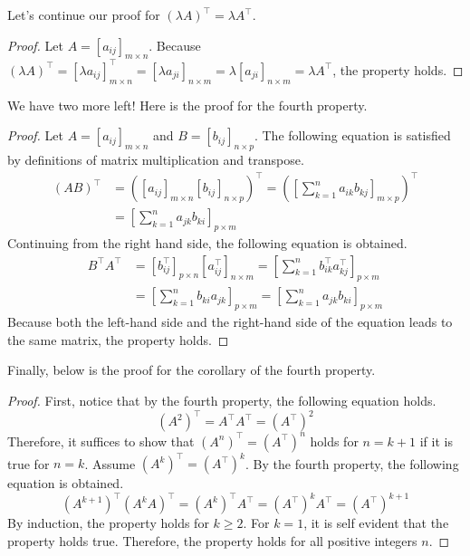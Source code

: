 \documentclass[../main.tex]{subfiles}
\begin{document}
Let's continue our proof for $(\lambda A)^\intercal =
\lambda A^\intercal$.

\begin{proof}
Let $A = [a_{ij}]_{m \times n}$. Because
$(\lambda A)^\intercal
= [\lambda a_{ij}]_{m \times n}^\intercal
= [\lambda a_{ji}]_{n \times m}
= \lambda [a_{ji}]_{n \times m}
= \lambda A^\intercal$, the property holds.
\end{proof}

We have two more left! Here is the proof for the fourth property.

\begin{proof}
Let $A = [a_{ij}]_{m \times n}$ and $B = [b_{ij}]_{n \times p}$.
The following equation is satisfied by definitions of matrix
multiplication and transpose.
\begin{align*}
    (AB)^\intercal
    &= \left(
        [a_{ij}]_{m \times n} [b_{ij}]_{n \times p}
    \right)^\intercal
    = \left(
        \left[ \sum_{k = 1}^{n} a_{ik} b_{kj} \right]_{m \times p}
    \right)^\intercal \\
    &= \left[ \sum_{k = 1}^{n} a_{jk} b_{ki} \right]_{p \times m}
\end{align*}
Continuing from the right hand side, the following equation is
obtained.
\begin{align*}
    B^\intercal A^\intercal
    &= \left[ b_{ij}^\intercal \right]_{p \times n}
        \left[ a_{ij}^\intercal \right]_{n \times m}
    = \left[
        \sum_{k = 1}^{n} b_{ik}^\intercal a_{kj}^\intercal
    \right]_{p \times m} \\
    &= \left[ \sum_{k = 1}^{n} b_{ki} a_{jk} \right]_{p \times m}
    = \left[ \sum_{k = 1}^{n} a_{jk} b_{ki} \right]_{p \times m}
\end{align*}
Because both the left-hand side and the right-hand side of the
equation leads to the same matrix, the property holds.
\end{proof}

Finally, below is the proof for the corollary of the fourth property.

\begin{proof}
First, notice that by the fourth property, the following equation
holds.
\[
\left( A^2 \right)^\intercal
= A^\intercal A^\intercal
= \left( A^\intercal \right)^2
\]
Therefore, it suffices to show that $(A^n)^\intercal =
(A^\intercal)^n$ holds for $n = k + 1$ if it is true for $n = k$.
Assume $(A^k)^\intercal = (A^\intercal)^k$. By the fourth property,
the following equation is obtained.
\[
\left( A^{k+1} \right)^\intercal
(A^k A)^\intercal
= (A^k)^\intercal A^\intercal
= (A^\intercal)^k A^\intercal
= (A^\intercal)^{k + 1}
\]
By induction, the property holds for $k \geq 2$. For $k = 1$,
it is self evident that the property holds true. Therefore, the
property holds for all positive integers $n$.
\end{proof}
\end{document}
